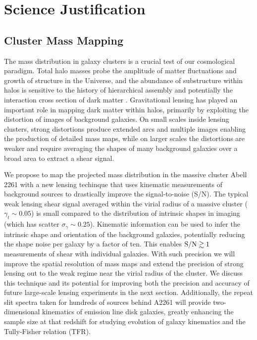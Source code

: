 \documentclass[11pt,preprint]{aastex}
\begin{document}

\section{Science Justification}

\subsection{Cluster Mass Mapping}

The mass distribution in galaxy clusters is a crucial test of our cosmological paradigm. Total halo masses probe the amplitude of matter fluctuations and growth of structure in the Universe, and the abundance of substructure within halos is sensitive to the history of hierarchical assembly and potentially the interaction cross section of dark matter \citep[e.g.,][]{Natarajan2002a, Natarajan2002b, Voit2005, Clowe2006}. Gravitational lensing has played an important role in mapping dark matter within halos, primarily by exploiting the distortion of images of background galaxies. On small scales inside lensing clusters, strong distortions produce extended arcs and multiple images enabling the production of detailed mass maps, while on larger scales the distortions are weaker and require averaging the shapes of many background galaxies over a broad area to extract a shear signal.

We propose to map the projected mass distribution in the massive cluster Abell 2261 with a new lensing techinque that uses kinematic measurements of background sources to drastically improve the signal-to-noise (S/N). The typical weak lensing shear signal averaged within the virial radius of a massive cluster ($\gamma_t\sim0.05$) is small compared to the distribution of intrinsic shapes in imaging (which has scatter $\sigma_\gamma\sim0.25$). Kinematic information can be used to infer the intrinsic shape and orientation of the background galaxies, potentially reducing the shape noise per galaxy by a factor of ten. This enables ${\rm S/N}\gtrsim1$ measurements of shear with individual galaxies. With such precision we will improve the spatial resolution of mass maps and extend the precision of strong lensing out to the weak regime near the virial radius of the cluster. We discuss this technique and its potential for improving both the precision and accuracy of future large-scale lensing experiments in the next section. Additionally, the repeat slit spectra taken for hundreds of sources behind A2261 will provide two-dimensional kinematics of emission line disk galaxies, greatly enhancing the sample size at that redshift for studying evolution of galaxy kinematics and the Tully-Fisher relation (TFR).
\end{document}
